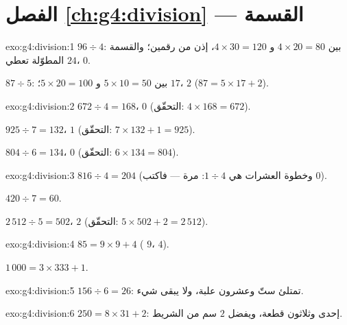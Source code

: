 \section*{الفصل \ref{ch:g4:division} --- القسمة}

\begin{solution}{exo:g4:division:1}
$96 \div 4$: بين $4 \times 20 = 80$ و $4 \times 30 = 120$، إذن
 من رقمين؛ والقسمة المطوّلة تعطي $24$، 
$0$.

$87 \div 5$: بين $5 \times 10 = 50$ و $5 \times 20 = 100$؛
 $17$،  $2$ ($87 = 5 \times 17 + 2$).
\end{solution}

\begin{solution}{exo:g4:division:2}
$672 \div 4 = 168$،  $0$ (التحقّق: $4 \times 168 = 672$).

$925 \div 7 = 132$،  $1$ (التحقّق:
$7 \times 132 + 1 = 925$).

$804 \div 6 = 134$،  $0$ (التحقّق: $6 \times 134 = 804$).
\end{solution}

\begin{solution}{exo:g4:division:3}
$816 \div 4 = 204$ (وخطوة العشرات هي $1 \div 4$:  مرة ---
فاكتب $0$).

$420 \div 7 = 60$.

$2\,512 \div 5 = 502$،  $2$ (التحقّق:
$5 \times 502 + 2 = 2\,512$).
\end{solution}

\begin{solution}{exo:g4:division:4}
$85 = 9 \times 9 + 4$ ( $9$،  $4$).

$1\,000 = 3 \times 333 + 1$.
\end{solution}

\begin{solution}{exo:g4:division:5}
$156 \div 6 = 26$: تمتلئ ستّ وعشرون علبة، ولا يبقى شيء.
\end{solution}

\begin{solution}{exo:g4:division:6}
$250 = 8 \times 31 + 2$: إحدى وثلاثون قطعة، ويفضل $2$ سم من
الشريط.
\end{solution}

